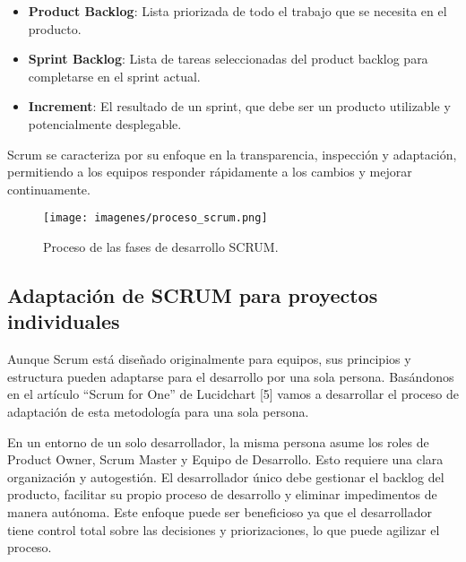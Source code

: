 \begin{itemize}
\begin{itemize}
        \item\textbf{Product Backlog}: Lista priorizada de todo el trabajo que se necesita en el producto.
        \item\textbf{Sprint Backlog}: Lista de tareas seleccionadas del product backlog para completarse en el sprint actual.
        \item\textbf{Increment}: El resultado de un sprint, que debe ser un producto utilizable y potencialmente desplegable.
          
    \end{itemize}
   
\end{itemize}

Scrum se caracteriza por su enfoque en la transparencia, inspección y
adaptación, permitiendo a los equipos responder rápidamente a los cambios y mejorar continuamente.

\begin{figure}[ht!]
  \centering
  \texttt{[image: imagenes/proceso\_scrum.png]}
  \caption{Proceso de las fases de desarrollo SCRUM.}
  \label{Fig.FasesSCRUM}
\end{figure}

\subsection{Adaptación de SCRUM para proyectos individuales}
Aunque Scrum está diseñado originalmente para equipos, sus principios y
estructura pueden adaptarse para el desarrollo por una sola persona. Basándonos en el artículo “Scrum for One” de Lucidchart [5] vamos a desarrollar el proceso de adaptación de esta metodología para una sola persona. 

En un entorno de un solo desarrollador, la misma persona asume los roles de Product Owner, Scrum Master y Equipo de Desarrollo. Esto requiere una clara organización y autogestión. El desarrollador único debe gestionar el backlog del producto, facilitar su propio proceso de desarrollo y eliminar impedimentos de manera autónoma. Este enfoque puede ser beneficioso ya que el desarrollador tiene control total sobre las decisiones y priorizaciones, lo que puede agilizar el proceso. 

